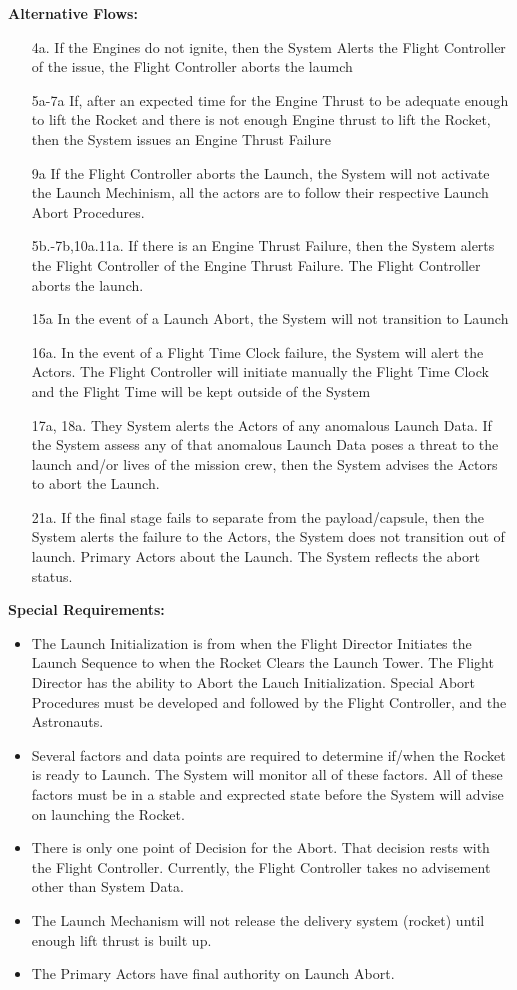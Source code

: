 \documentclass[letterpaper]{article}
\begin{document}
\textbf{Alternative Flows:}
\begin{itemize}
\item[4a.]If the Engines do not ignite, then the System Alerts the
Flight Controller of the issue, the Flight Controller aborts the
laumch
\item[5a-7a]If, after an expected time for the Engine Thrust to be
adequate enough to lift the Rocket and there is not enough Engine
thrust to lift the Rocket, then the System issues an Engine
Thrust Failure
\item[9a]If the Flight Controller aborts the Launch, the
System will not activate the Launch Mechinism, all the actors are to
follow their respective Launch Abort Procedures.
\item[5b.-7b,10a.11a.] If there is an Engine Thrust Failure, then the
System alerts the Flight Controller of the Engine Thrust Failure. The
Flight Controller aborts the launch.
\item[15a]In the event of a Launch Abort, the System will not
transition to Launch
\item[16a.] In the event of a Flight Time Clock failure, the System
will alert the Actors.  The Flight Controller will initiate manually the
Flight Time Clock and the Flight Time will be kept outside of the
System
\item[17a, 18a.]They System alerts the Actors of any anomalous Launch
Data.  If the System assess any of that anomalous Launch Data poses a
threat to the launch and/or lives of the mission crew, then the System
advises the Actors to abort the Launch.
\item[21a.]If the final stage fails to separate from the
payload/capsule, then the System alerts the failure to the Actors, the
System does not transition out of launch.  Primary Actors about the
Launch.  The System reflects the abort status.
\end{itemize}
\textbf{Special Requirements:}
\begin{itemize}
\item The Launch Initialization is from when the Flight Director
Initiates the Launch Sequence to when the Rocket Clears the Launch
Tower.  The Flight Director has the ability to Abort the Lauch
Initialization.  Special Abort Procedures must be developed and
followed by the Flight Controller, and the Astronauts.
\item Several factors and data points are required to determine
if/when the Rocket is ready to Launch.  The System will monitor all
of these factors.  All of these factors must be in a stable and
exprected state before the System will advise on launching the Rocket.
\item There is only one point of Decision for the Abort.  That decision
rests with the Flight Controller.  Currently, the Flight Controller
takes no advisement other than System Data.
\item The Launch Mechanism will not release the delivery system
(rocket) until enough lift thrust is built up.
\item The Primary Actors have final authority on Launch Abort.
\end{itemize}
\end{document}
